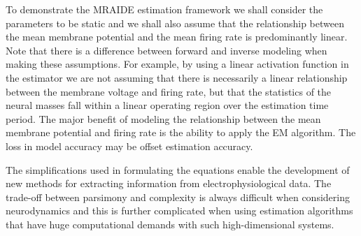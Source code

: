 \documentclass[review,authoryear,3p]{elsarticle}
\begin{document}
To demonstrate the MRAIDE estimation framework we shall consider the parameters to be static and we shall also assume that the relationship between the mean membrane potential and the mean firing rate is predominantly linear. Note that there is a difference between forward and inverse modeling when making these assumptions. For example, by using a linear activation function in the estimator we are not assuming that there is necessarily a linear relationship between the membrane voltage and firing rate, but that the statistics of the neural masses fall within a linear operating region over the estimation time period. The major benefit of modeling the relationship between the mean membrane potential and firing rate is the ability to apply the EM algorithm. The loss in model accuracy may be offset estimation accuracy. 

The simplifications used in formulating the equations enable the development of new methods for extracting information from electrophysiological data. The trade-off between parsimony and complexity is always difficult when considering neurodynamics and this is further complicated when using estimation algorithms that have huge computational demands with such high-dimensional systems.   
\end{document}
